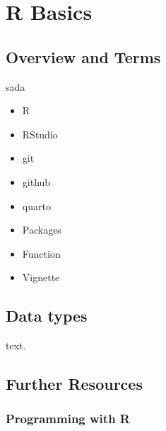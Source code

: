 \documentclass[
  letterpaper,
  DIV=11,
  numbers=noendperiod]{scrreprt}
\providecommand{\tightlist}{%
  \setlength{\itemsep}{0pt}\setlength{\parskip}{0pt}}\usepackage{longtable,booktabs,array}
\begin{document}

\hypertarget{r-basics}{%
\chapter{R Basics}\label{r-basics}}

\hypertarget{overview-and-terms}{%
\section{Overview and Terms}\label{overview-and-terms}}

sada

\begin{itemize}
\tightlist
\item
  R
\item
  RStudio
\item
  git
\item
  github
\item
  quarto
\item
  Packages
\item
  Function
\item
  Vignette
\end{itemize}

\hypertarget{data-types}{%
\section{Data types}\label{data-types}}

text.

\hypertarget{further-resources}{%
\section{Further Resources}\label{further-resources}}

\hypertarget{programming-with-r}{%
\subsection{Programming with R}\label{programming-with-r}}
\end{document}
